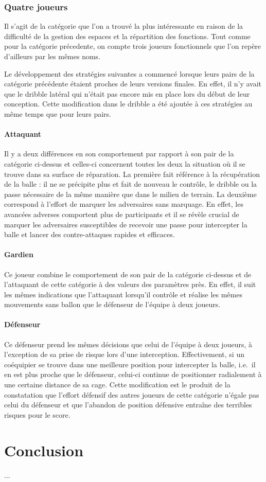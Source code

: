 \documentclass[12pt,a4paper]{article}
\begin{document}
\section{Quatre joueurs}
Il s'agit de la cat\'egorie que l'on a trouv\'e la plus int\'eressante en 
raison de la difficult\'e de la gestion des espaces et la r\'epartition des 
fonctions. Tout comme pour la cat\'egorie pr\'ecedente, on compte trois 
joueurs fonctionnels que l'on rep\`ere d'ailleurs par les m\^emes noms. 

Le d\'eveloppement des strat\'egies suivantes a commenc\'e lorsque leurs pairs 
de la cat\'egorie pr\'ec\'edente \'etaient proches de leurs versions finales. 
En effet, il n'y avait que le dribble lat\'eral qui n'\'etait pas encore mis en 
place lors du d\'ebut de leur conception. 
Cette modification dans le dribble a \'et\'e ajout\'ee \`a ces strat\'egies au 
m\^eme temps que pour leurs pairs.

\subsection*{Attaquant}
Il y a deux diff\'erences en son comportement par rapport \`a son pair 
de la cat\'egorie ci-dessus et celles-ci concernent toutes les deux la 
situation o\`u il se trouve dans sa surface de r\'eparation. La premi\`ere fait 
r\'ef\'erence \`a la r\'ecup\'eration de la balle : il ne se 
pr\'ecipite plus et fait de nouveau le contr\^ole, le dribble ou la passe 
n\'ecessaire de la m\^eme mani\`ere que dans le milieu de terrain. 
La deuxi\`eme correspond \`a l'effort de marquer les adversaires sans 
marquage. En effet, les avanc\'ees adverses comportent plus de participants et 
il se r\'ev\`ele crucial de marquer les adversaires susceptibles de 
recevoir une passe pour intercepter la balle et lancer des contre-attaques 
rapides et efficaces.

\subsection*{Gardien}
Ce joueur combine le comportement de son pair de la cat\'egorie ci-dessus et de 
l'attaquant de cette cat\'egorie \`a des valeurs des param\`etres pr\`es. En 
effet, il suit les m\^emes indications que 
l'attaquant lorsqu'il contr\^ole et r\'ealise les m\^emes mouvements sans ballon 
que le d\'efenseur de l'\'equipe \`a deux joueurs.

\subsection*{D\'efenseur}
Ce d\'efenseur prend les m\^emes d\'ecisions que celui de l'\'equipe \`a 
deux joueurs, \`a l'exception de sa prise de risque lors d'une interception. 
Effectivement, si un co\'equipier se trouve dans une meilleure position pour 
intercepter la balle, i.e.\ il en est plus proche que le d\'efenseur, celui-ci 
continue de positionner radialement \`a une certaine distance de sa cage. Cette 
modification est le produit de la constatation que l'effort d\'efensif des 
autres joueurs de cette cat\'egorie n'\'egale pas celui du d\'efenseur et que 
l'abandon de position d\'efensive entra\^ine des terribles risques pour le 
score.

\newpage

\part*{Conclusion}
...
\end{document}
